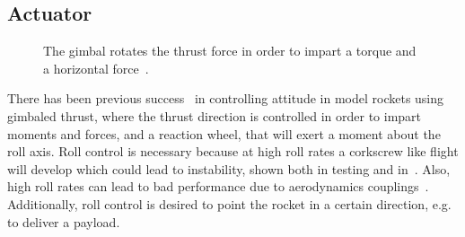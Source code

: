 \subsection{Actuator}

\begin{wrapfigure}{r}{0.4 \textwidth}
    \centering
    
    \caption{The gimbal rotates the thrust force in order to impart a torque and a horizontal force~\cite{NASATVC}.}
\end{wrapfigure}
%    
There has been previous success~\cite{BPS} in controlling \gls{attitude} in model rockets using gimbaled thrust, where the thrust direction is controlled in order to impart moments and forces, and a reaction wheel, that will exert a moment about the roll axis.
Roll control is necessary because at high roll rates a corkscrew like flight will develop which could lead to instability, shown both in testing and in~\cite{Kehl2015}.
Also, high roll rates can lead to bad performance due to aerodynamics couplings~\cite{Dong2019}.
Additionally, roll control is desired to point the rocket in a certain direction, e.g. to deliver a payload.

